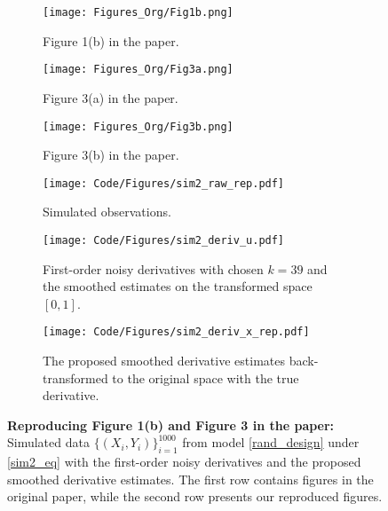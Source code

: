 \documentclass{uwstat572}
\theoremstyle{definition}
\theoremstyle{theorem}
\begin{document}
\begin{figure}[t]
	\captionsetup[subfigure]{justification=centering}
	\begin{subfigure}[t]{0.32\linewidth}
		\centering
		\texttt{[image: Figures\_Org/Fig1b.png]}
		\caption{Figure 1(b) in the paper.}
	\end{subfigure}
	\hfil
	\begin{subfigure}[t]{0.32\linewidth}
		\centering
		\texttt{[image: Figures\_Org/Fig3a.png]}
		\caption{Figure 3(a) in the paper.}
	\end{subfigure}
	\hfil
	\begin{subfigure}[t]{0.32\linewidth}
		\centering
		\texttt{[image: Figures\_Org/Fig3b.png]}
		\caption{Figure 3(b) in the paper.}
	\end{subfigure}
	\begin{subfigure}[t]{0.32\linewidth}
		\centering
		\texttt{[image: Code/Figures/sim2\_raw\_rep.pdf]}
		\caption{Simulated observations.}
	\end{subfigure}
	\hfil
	\begin{subfigure}[t]{0.32\linewidth}
		\centering
		\texttt{[image: Code/Figures/sim2\_deriv\_u.pdf]}
		\caption{First-order noisy derivatives with chosen $k=39$ and the smoothed estimates on the transformed space $[0,1]$.}
	\end{subfigure}
	\hfil
	\begin{subfigure}[t]{0.32\linewidth}
		\centering
		\texttt{[image: Code/Figures/sim2\_deriv\_x\_rep.pdf]}
		\caption{The proposed smoothed derivative estimates back-transformed to the original space with the true derivative.}
	\end{subfigure}
	\caption{{\bf Reproducing Figure 1(b) and Figure 3 in the paper:} Simulated data $\{(X_i,Y_i)\}_{i=1}^{1000}$ from model \eqref{rand_design} under \eqref{sim2_eq} with the first-order noisy derivatives and the proposed smoothed derivative estimates. The first row contains figures in the original paper, while the second row presents our reproduced figures.}
	\label{fig:sim2_rep}
\end{figure}
\end{document}

